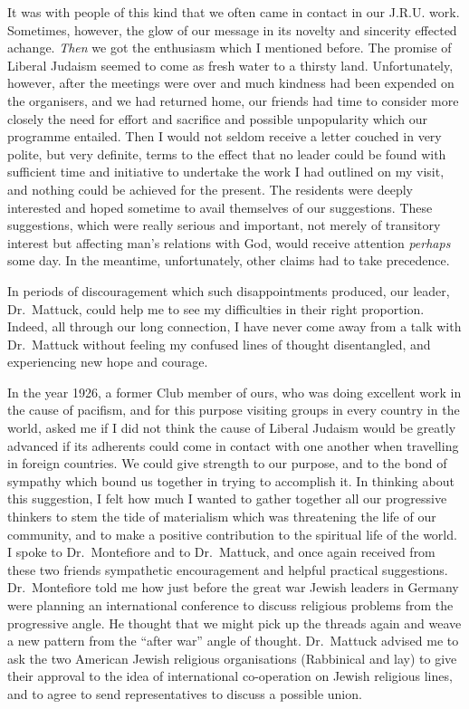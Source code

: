 It was with people of this kind that we often came in
contact in our J.R.U. work. Sometimes, however, the
glow of our message in its novelty and sincerity effected
achange. \textsl{Then} we got the enthusiasm which I mentioned
before. The promise of Liberal Judaism seemed to come
as fresh water to a thirsty land. Unfortunately, however,
after the meetings were over and much kindness had been
expended on the organisers, and we had returned home,
our friends had time to consider more closely the need
for effort and sacrifice and possible unpopularity which
our programme entailed. Then I would not seldom
receive a letter couched in very polite, but very definite,
terms to the effect that no leader could be found with
sufficient time and initiative to undertake the work I
had outlined on my visit, and nothing could be achieved
for the present. The residents were deeply interested
and hoped sometime to avail themselves of our suggestions.
These suggestions, which were really serious and
important, not merely of transitory interest but affecting
man’s relations with God, would receive attention
\textsl{perhaps} some day. In the meantime, unfortunately,
other claims had to take precedence.

In periods of discouragement which such
disappointments produced, our leader, Dr.\ Mattuck, could
help me to see my difficulties in their right proportion.
Indeed, all through our long connection, I have never
come away from a talk with Dr.\ Mattuck without feeling
my confused lines of thought disentangled, and experiencing
new hope and courage.

In the year 1926, a former Club member of ours, who
was doing excellent work in the cause of pacifism, and for
this purpose visiting groups in every country in the
world, asked me if I did not think the cause of Liberal
Judaism would be greatly advanced if its adherents could
come in contact with one another when travelling in
foreign countries. We could give strength to our purpose,
and to the bond of sympathy which bound us together in
trying to accomplish it. In thinking about this suggestion,
I felt how much I wanted to gather together all our
progressive thinkers to stem the tide of materialism
which was threatening the life of our community, and to
make a positive contribution to the spiritual life of the
world. I spoke to Dr.\ Montefiore and to Dr.\ Mattuck,
and once again received from these two friends sympathetic
encouragement and helpful practical suggestions.
Dr.\ Montefiore told me how just before the great war
Jewish leaders in Germany were planning an international
conference to discuss religious problems from
the progressive angle. He thought that we might pick
up the threads again and weave a new pattern from the
“after war” angle of thought. Dr.\ Mattuck advised me
to ask the two American Jewish religious organisations
(Rabbinical and lay) to give their approval to the idea
of international co-operation on Jewish religious lines,
and to agree to send representatives to discuss a possible
union.

